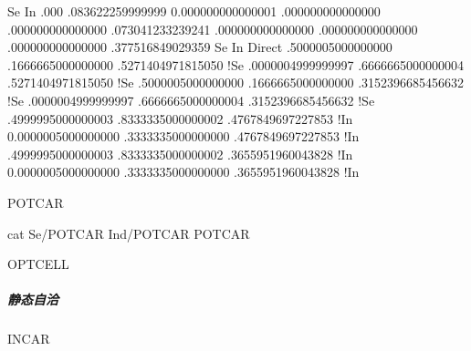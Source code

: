 \documentclass[a4paper,12pt,english]{sphinxmanual}
\begin{document}
\begin{sphinxVerbatim}[commandchars=\\\{\}]
  Se   In
  .000
       .083622259999999      \PYGZhy{}0.000000000000001       .000000000000000
       .000000000000000       .073041233239241       .000000000000000
       .000000000000000       .000000000000000      .377516849029359
  Se   In
     
Direct
  .5000005000000000   .1666665000000000   .5271404971815050   !Se
  .0000004999999997   .6666665000000004   .5271404971815050   !Se
  .5000005000000000   .1666665000000000   .3152396685456632   !Se
  .0000004999999997   .6666665000000004   .3152396685456632   !Se
  .4999995000000003   .8333335000000002   .4767849697227853   !In
 \PYGZhy{}0.0000005000000000   .3333335000000000   .4767849697227853   !In
  .4999995000000003   .8333335000000002   .3655951960043828   !In
 \PYGZhy{}0.0000005000000000   .3333335000000000   .3655951960043828   !In
\end{sphinxVerbatim}

\begin{DUlineblock}{0em}
\item[] POTCAR
\end{DUlineblock}

\begin{sphinxVerbatim}[commandchars=\\\{\}]
cat Se/POTCAR In\PYGZus{}d/POTCAR \PYGZgt{} POTCAR
\end{sphinxVerbatim}

\begin{DUlineblock}{0em}
\item[] OPTCELL
\end{DUlineblock}

\begin{sphinxVerbatim}[commandchars=\\\{\}]
\end{sphinxVerbatim}


\subparagraph{静态自洽}
\label{\detokenize{tutorials/vasp/mobility:id7}}
\begin{DUlineblock}{0em}
\item[] INCAR
\end{DUlineblock}
\end{document}
